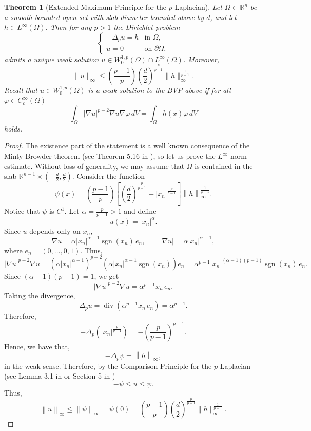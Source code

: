 \documentclass[11pt]{amsart}
\newtheorem{theorem}{Theorem}[section]
\theoremstyle{definition}
\begin{document}
\begin{theorem}[Extended Maximum Principle for the $p$-Laplacian]
\label{thm:maximum_principle}
Let $\Omega \subset \mathbb{R}^n$ be a smooth bounded open set with slab diameter bounded above by $d$, and let $h \in L^\infty(\Omega)$. Then for any $p>1$ the Dirichlet problem
\[
\begin{cases}
-\Delta_p u = h & \text{in } \Omega, \\
u = 0 & \text{on } \partial\Omega,
\end{cases}
\]
admits a unique weak solution $u \in W^{1,p}_0(\Omega) \cap L^\infty(\Omega)$. Moreover, 
\[
\|u\|_{\infty} \leq \left(\frac{p-1}{p}\right)
\left(\frac{d}{2}\right)^{\frac{p}{p-1}} \|h\|_{\infty}^{\frac{1}{p-1}}.
\]
\medskip
Recall that $u\in W^{1,p}_0\left(\Omega\right)$ is a weak solution to the BVP above if
for all $\varphi\in C_c^{\infty}\left(\Omega\right)$ 
\[
\int_{\Omega} \left|\nabla u\right|^{p-2}\nabla u\nabla \varphi \,dV= \int_{\Omega}h\left(x\right)\varphi\,dV
\]
holds.
\end{theorem}
\begin{proof}
The existence part of the statement is a well known consequence of the Minty-Browder theorem (see Theorem 5.16 in \cite{BrezisBook}), so let us prove the $L^{\infty}$-norm estimate.
Without loss of generality, we may assume that
$\Omega$ is contained in the slab $\mathbb{R}^{n-1}\times \left(-\frac{d}{2},\frac{d}{2}\right)$.
Consider the function
\[
\psi\left(x\right)= \left(\frac{p-1}{p}\right)\left[\left(\frac{d}{2}\right)^{\frac{p}{p-1}}-
\left|x_n\right|^{\frac{p}{p-1}}\right]\left\|h\right\|_{\infty}^{\frac{1}{p-1}}.
\]
Notice that $\psi$ is $C^1$. 
Let \(\alpha = \frac{p}{p-1} > 1\) and define
\[
u(x) = |x_n|^{\alpha}.
\]
Since \(u\) depends only on \(x_n\),
\[
\nabla u = \alpha |x_n|^{\alpha-1} \operatorname{sgn}(x_n) \, e_n,
\qquad
|\nabla u| = \alpha |x_n|^{\alpha-1},
\]
where $e_n=(0,\ldots, 0,1)$. Thus,
\[
|\nabla u|^{p-2} \nabla u
= \left( \alpha |x_n|^{\alpha-1} \right)^{p-2}
\left( \alpha |x_n|^{\alpha-1} \operatorname{sgn}(x_n) \right) e_n
= \alpha^{p-1} |x_n|^{(\alpha-1)(p-1)} \operatorname{sgn}(x_n) \, e_n.
\]
Since \((\alpha - 1)(p-1) = 1\), we get
\[
|\nabla u|^{p-2} \nabla u = \alpha^{p-1} x_n \, e_n.
\]
Taking the divergence,
\[
\Delta_p u = \operatorname{div} \left( \alpha^{p-1} x_n \, e_n \right)
= \alpha^{p-1}.
\]
Therefore,
\[
- \Delta_p \left( |x_n|^{\frac{p}{p-1}} \right)
= - \left( \frac{p}{p-1} \right)^{p-1}.
\]
Hence,
we have that,
\[
-\Delta_p \psi = \left\|h\right\|_{\infty},
\]
in the weak sense.
Therefore, by the Comparison Principle for the $p$-Laplacian
(see Lemma 3.1 in  \cite{Tolksdorf1983} or Section 5 in \cite{GarciaMelianSabina1998})
\[
-\psi \leq u \leq \psi.
\]
Thus, 
\[
\left\|u\right\|_{\infty}\leq \left\|\psi\right\|_{\infty}=\psi\left(0\right)
=\left(\frac{p-1}{p}\right)
\left(\frac{d}{2}\right)^{\frac{p}{p-1}} \|h\|_{\infty}^{\frac{1}{p-1}}.
\]
\end{proof}
\end{document}
